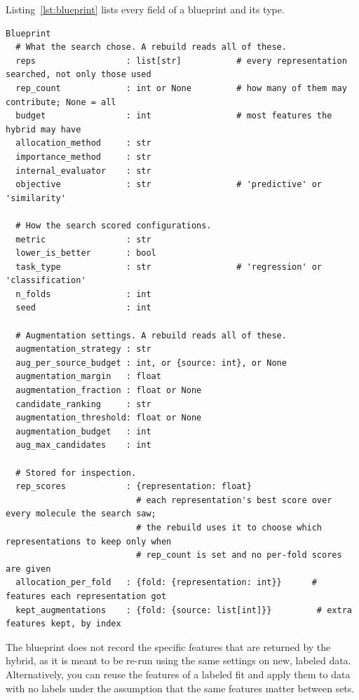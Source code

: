 Listing~\ref{lst:blueprint} lists every field of a blueprint and its type.
\begin{lstlisting}[float=htbp, breaklines=true, basicstyle=\scriptsize\ttfamily, columns=fullflexible, keepspaces=true, frame=single, caption={Fields of a blueprint and their types. Comment lines group the fields, and each field is given with its type and, where needed, a comment on its meaning.}, label=lst:blueprint, captionpos=b]
Blueprint
  # What the search chose. A rebuild reads all of these.
  reps                  : list[str]           # every representation searched, not only those used
  rep_count             : int or None         # how many of them may contribute; None = all
  budget                : int                 # most features the hybrid may have
  allocation_method     : str
  importance_method     : str
  internal_evaluator    : str
  objective             : str                 # 'predictive' or 'similarity'

  # How the search scored configurations.
  metric                : str
  lower_is_better       : bool
  task_type             : str                 # 'regression' or 'classification'
  n_folds               : int
  seed                  : int

  # Augmentation settings. A rebuild reads all of these.
  augmentation_strategy : str
  aug_per_source_budget : int, or {source: int}, or None
  augmentation_margin   : float
  augmentation_fraction : float or None
  candidate_ranking     : str
  augmentation_threshold: float or None
  augmentation_budget   : int
  aug_max_candidates    : int

  # Stored for inspection.
  rep_scores            : {representation: float}
                          # each representation's best score over every molecule the search saw;
                          # the rebuild uses it to choose which representations to keep only when
                          # rep_count is set and no per-fold scores are given
  allocation_per_fold   : {fold: {representation: int}}      # features each representation got
  kept_augmentations    : {fold: {source: list[int]}}         # extra features kept, by index
\end{lstlisting}


The blueprint does not record the specific features that are returned by the hybrid, as it is meant to be re-run using the same settings on new, labeled data. Alternatively, you can reuse the features of a labeled fit and apply them to data with no labels under the assumption that the same features matter between sets. 

